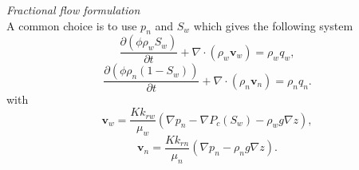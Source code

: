\documentclass[a4paper,10pt]{report}
\begin{document}
\emph{Fractional flow formulation}\\
 A common choice is to use $p_n$ and $S_w$ which gives the following system
 \begin{equation}
 \frac{\partial(\phi \rho_{w}{S}_{w})}{\partial t}+\nabla \cdot ( \rho_{w} \mathbf{v}_{w})=\rho_{w} q_{w},
\end{equation}
\begin{equation}
 \frac{\partial(\phi \rho_{n}(1-{S}_{w}))}{\partial t}+\nabla \cdot ( \rho_{n} \mathbf{v}_{n})=\rho_{n} q_{n}.
\end{equation}
with
\begin{equation}
\mathbf{v}_{w}=\frac{{K}k_{rw}}{\mu_w}(\nabla p_n-\nabla P_c(S_w)-\rho_w g \nabla z),
\end{equation}
\begin{equation}
 \mathbf{v}_{n}= \frac{{K}k_{rn}}{\mu_n}(\nabla p_n-\rho_n g \nabla z).
\end{equation}
\end{document}

